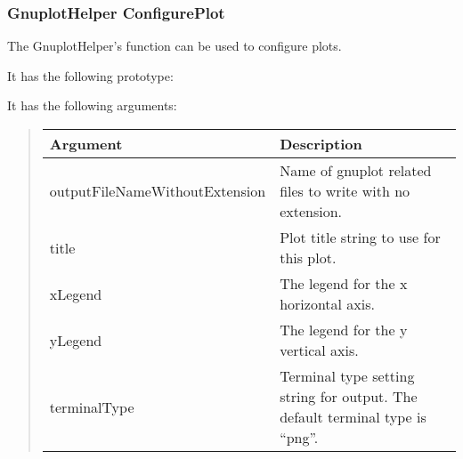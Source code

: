 \documentclass[letterpaper,10pt,english]{sphinxmanual}
\renewcommand{\sphinxcode}[1]{\texttt{\small{#1}}}
\begin{document}
\subsubsection{GnuplotHelper ConfigurePlot}
\label{\detokenize{data-collection-helpers:gnuplothelper-configureplot}}
The GnuplotHelper’s \sphinxcode{} function can be used
to configure plots.

It has the following prototype:

\begin{sphinxVerbatim}[commandchars=\\\{\}]
    
                      
                      
                      
                        
\end{sphinxVerbatim}

It has the following arguments:
\begin{quote}


\begin{savenotes}\sphinxattablestart
\centering
\begin{tabulary}{\linewidth}[t]{|T|T|}
\hline
\sphinxstyletheadfamily 
Argument
&\sphinxstyletheadfamily 
Description
\\
\hline
outputFileNameWithoutExtension
&
Name of gnuplot related files
to write with no extension.
\\
\hline
title
&
Plot title string to use for
this plot.
\\
\hline
xLegend
&
The legend for the x
horizontal axis.
\\
\hline
yLegend
&
The legend for the y
vertical axis.
\\
\hline
terminalType
&
Terminal type setting string
for output.  The default
terminal type is “png”.
\\
\hline
\end{tabulary}
\par
\sphinxattableend\end{savenotes}
\end{quote}
\end{document}
